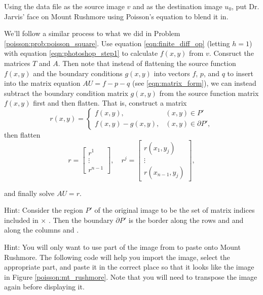 \begin{problem}
Using the data file  as the source image $v$ and  as the destination image $u_0$, put Dr. Jarvis' face on Mount Rushmore using Poisson's equation to blend it in.

We'll follow a similar process to what we did in Problem \ref{poisson:prob:poisson_square}.
Use equation \eqref{eqn:finite_diff_op} (letting $h=1$) with equation \eqref{eqn:photoshop_step1} to calculate $f(x, y)$ from $v$.
Consruct the matrices $T$ and $A$.
Then note that instead of flattening the source function $f(x, y)$ and the boundary conditions $g(x, y)$ into vectors $f$, $p$, and $q$ to insert into the matrix equation $AU = f - p - q$ (see \eqref{eqn:matrix_form}), we can instead subtract the boundary condition matrix $g(x, y)$ from the source function matrix $f(x, y)$ first and then flatten.
That is, construct a matrix
\begin{equation*}
r(x, y) =
\begin{cases}
f(x, y), & (x, y) \in P'\\
f(x, y) - g(x, y), & (x, y) \in \partial P',
\end{cases}
\end{equation*}
then flatten
\begin{equation*}
r =
\begin{bmatrix}
r^1 \\ \vdots \\ r^{n-1}
\end{bmatrix}, \quad
r^j =
\begin{bmatrix}
r(x_1, y_j)\\ \vdots \\ r(x_{n-1}, y_j)
\end{bmatrix},
\end{equation*}

\noindent and finally solve $AU = r$. 

Hint: Consider the region $P'$ of the original image to be the set of matrix indices included in \li{[x0, x0+w-1]} $\times$ \li{[y0, y0+w-1]}.
Then the boundary $\partial P'$ is the border along the rows  and  and along the columns  and .

Hint: You will only want to use part of the image from  to paste onto Mount Rushmore.
The following code will help you import the image, select the appropriate part, and paste it in the correct place so that it looks like the image in Figure \ref{poisson:mt_rushmore}.
Note that you will need to transpose the image again before displaying it.


\end{problem}
